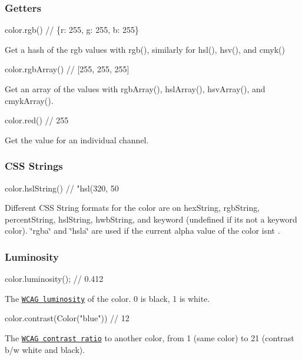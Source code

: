\subsubsection*{Getters}


\begin{DoxyCode}
color.rgb()       // \{r: 255, g: 255, b: 255\}
\end{DoxyCode}
 Get a hash of the rgb values with {\ttfamily rgb()}, similarly for {\ttfamily hsl()}, {\ttfamily hsv()}, and {\ttfamily cmyk()}


\begin{DoxyCode}
color.rgbArray()  // [255, 255, 255]
\end{DoxyCode}
 Get an array of the values with {\ttfamily rgb\+Array()}, {\ttfamily hsl\+Array()}, {\ttfamily hsv\+Array()}, and {\ttfamily cmyk\+Array()}.


\begin{DoxyCode}
color.red()       // 255
\end{DoxyCode}
 Get the value for an individual channel.

\subsubsection*{C\+SS Strings}


\begin{DoxyCode}
color.hslString()  // "hsl(320, 50%
\end{DoxyCode}


Different C\+SS String formats for the color are on {\ttfamily hex\+String}, {\ttfamily rgb\+String}, {\ttfamily percent\+String}, {\ttfamily hsl\+String}, {\ttfamily hwb\+String}, and {\ttfamily keyword} (undefined if it\textquotesingle{}s not a keyword color). {\ttfamily \char`\"{}rgba\char`\"{}} and {\ttfamily \char`\"{}hsla\char`\"{}} are used if the current alpha value of the color isn\textquotesingle{}t {}.

\subsubsection*{Luminosity}


\begin{DoxyCode}
color.luminosity();  // 0.412
\end{DoxyCode}
 The \href{http://www.w3.org/TR/WCAG20/#relativeluminancedef}{\tt W\+C\+AG luminosity} of the color. 0 is black, 1 is white.


\begin{DoxyCode}
color.contrast(Color("blue"))  // 12
\end{DoxyCode}
 The \href{http://www.w3.org/TR/WCAG20/#contrast-ratiodef}{\tt W\+C\+AG contrast ratio} to another color, from 1 (same color) to 21 (contrast b/w white and black).


